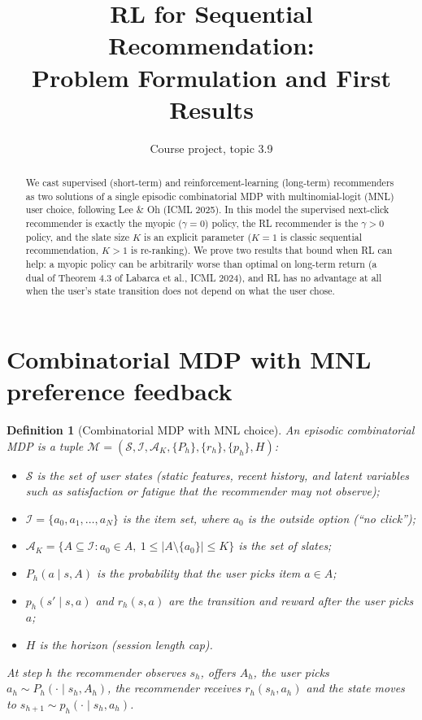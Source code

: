\documentclass[11pt]{article}
\title{RL for Sequential Recommendation:\\ Problem Formulation and First Results}
\author{Course project, topic 3.9}
\date{}
\newtheorem{definition}{Definition}
\theoremstyle{remark}
\newcommand{\I}{\mathcal{I}}
\newcommand{\Sset}{\mathcal{S}}
\newcommand{\Aset}{\mathcal{A}}
\begin{document}
\maketitle

\begin{abstract}
We cast supervised (short-term) and reinforcement-learning (long-term) recommenders as two solutions of a single
episodic combinatorial MDP with multinomial-logit (MNL) user choice, following Lee \& Oh (ICML 2025).
In this model the supervised next-click recommender is exactly the myopic ($\gamma = 0$) policy, the RL recommender
is the $\gamma > 0$ policy, and the slate size $K$ is an explicit parameter ($K = 1$ is classic sequential
recommendation, $K > 1$ is re-ranking). We prove two results that bound when RL can help:
a myopic policy can be arbitrarily worse than optimal on long-term return (a dual of Theorem 4.3 of
Labarca et al., ICML 2024), and RL has no advantage at all when the user's state transition does not depend on what
the user chose.
\end{abstract}

\section{Combinatorial MDP with MNL preference feedback}

\begin{definition}[Combinatorial MDP with MNL choice]
An episodic combinatorial MDP is a tuple $\mathcal{M} = (\Sset, \I, \Aset_K, \{P_h\}, \{r_h\}, \{p_h\}, H)$:
\begin{itemize}
  \item $\Sset$ is the set of user states (static features, recent history, and latent variables such as
  satisfaction or fatigue that the recommender may not observe);
  \item $\I = \{a_0, a_1, \dots, a_N\}$ is the item set, where $a_0$ is the outside option (``no click'');
  \item $\Aset_K = \{A \subseteq \I : a_0 \in A,\ 1 \le |A \setminus \{a_0\}| \le K\}$ is the set of slates;
  \item $P_h(a \mid s, A)$ is the probability that the user picks item $a \in A$;
  \item $p_h(s' \mid s, a)$ and $r_h(s, a)$ are the transition and reward after the user picks $a$;
  \item $H$ is the horizon (session length cap).
\end{itemize}
At step $h$ the recommender observes $s_h$, offers $A_h$, the user picks $a_h \sim P_h(\cdot \mid s_h, A_h)$,
the recommender receives $r_h(s_h, a_h)$ and the state moves to $s_{h+1} \sim p_h(\cdot \mid s_h, a_h)$.
\end{definition}
\end{document}
